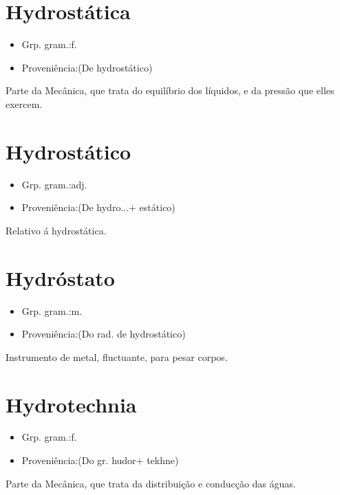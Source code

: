\documentclass{article}
\begin{document}
\section{Hydrostática}
\begin{itemize}
\item {Grp. gram.:f.}
\end{itemize}
\begin{itemize}
\item {Proveniência:(De \textunderscore hydrostático\textunderscore )}
\end{itemize}
Parte da Mecânica, que trata do equilíbrio dos líquidos, e da pressão que elles exercem.
\section{Hydrostático}
\begin{itemize}
\item {Grp. gram.:adj.}
\end{itemize}
\begin{itemize}
\item {Proveniência:(De \textunderscore hydro...\textunderscore  + \textunderscore estático\textunderscore )}
\end{itemize}
Relativo á hydrostática.
\section{Hydróstato}
\begin{itemize}
\item {Grp. gram.:m.}
\end{itemize}
\begin{itemize}
\item {Proveniência:(Do rad. de \textunderscore hydrostático\textunderscore )}
\end{itemize}
Instrumento de metal, fluctuante, para pesar corpos.
\section{Hydrotechnia}
\begin{itemize}
\item {Grp. gram.:f.}
\end{itemize}
\begin{itemize}
\item {Proveniência:(Do gr. \textunderscore hudor\textunderscore  + \textunderscore tekhne\textunderscore )}
\end{itemize}
Parte da Mecânica, que trata da distribuição e conducção das águas.
\end{document}
